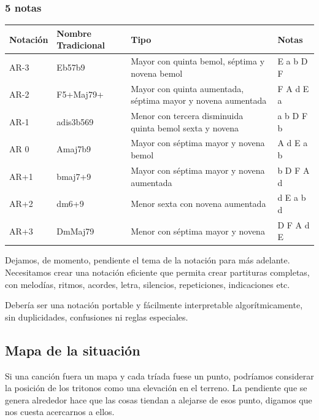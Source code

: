 \documentclass[]{report}
\begin{document}
\subsubsection*{5 notas}
\begin{table}[H]
	\centering
	\begin{tabularx}{\textwidth}{ll>{\raggedright\arraybackslash}Xl}
		\toprule
		Notación      & Nombre Tradicional & Tipo                                                         & Notas     \\
		\midrule
		\textsf{AR-3} & Eb57b9             & Mayor con quinta bemol, séptima y novena bemol               & E a b D F \\
		\textsf{AR-2} & F5+Maj79+          & Mayor con quinta aumentada, séptima mayor y novena aumentada & F A d E a \\
		\textsf{AR-1} & adis3b569          & Menor con tercera disminuida quinta bemol sexta y novena     & a b D F b \\
		\textsf{AR 0} & Amaj7b9            & Mayor con séptima mayor y novena bemol                       & A d E a b \\
		\textsf{AR+1} & bmaj7+9            & Mayor con séptima mayor y novena aumentada                   & b D F A d \\
		\textsf{AR+2} & dm6+9              & Menor sexta con novena aumentada                             & d E a b d \\
		\textsf{AR+3} & DmMaj79            & Menor con séptima mayor y novena                             & D F A d E \\
		\bottomrule
	\end{tabularx}
\end{table}

Dejamos, de momento, pendiente el tema de la notación para más adelante.  Necesitamos crear una notación eficiente que permita crear partituras completas, con melodías, ritmos, acordes, letra, silencios, repeticiones, indicaciones etc.

Debería ser una notación portable y fácilmente interpretable algorítmicamente, sin duplicidades, confusiones ni reglas especiales.

\subsection{Mapa de la situación}

Si una canción fuera un mapa y cada tríada fuese un punto, podríamos considerar la posición de los tritonos como una elevación en el terreno. La pendiente que se genera alrededor hace que las cosas tiendan a alejarse de esos punto, digamos que nos cuesta acercarnos a ellos.
\end{document}
